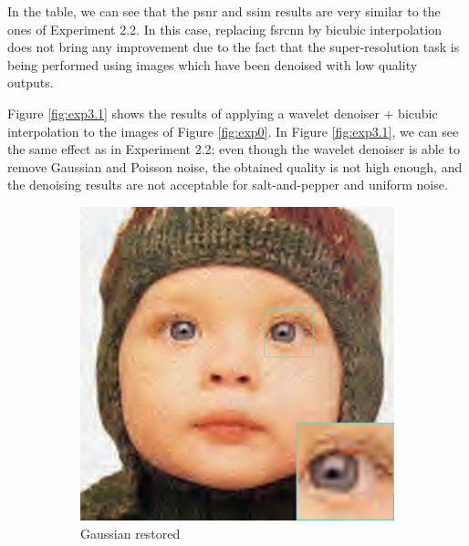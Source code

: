 In the table, we can see that the \gls{psnr} and \gls{ssim} results are very similar to the ones of Experiment 2.2. In this case, replacing \gls{fsrcnn} by bicubic interpolation does not bring any improvement due to the fact that the super-resolution task is being performed using images which have been denoised with low quality outputs.

Figure \ref{fig:exp3.1} shows the results of applying a wavelet denoiser $+$ bicubic interpolation to the images of Figure \ref{fig:exp0}. In Figure \ref{fig:exp3.1}, we can see the same effect as in Experiment 2.2: even though the wavelet denoiser is able to remove Gaussian and Poisson noise, the obtained quality is not high enough, and the denoising results are not acceptable for salt-and-pepper and uniform noise.

\begin{figure}
	\centering
	\begin{subfigure}{0.24\textwidth}
		\includegraphics[width=\textwidth]{images/exp3.1/gaussian.png}
		\caption{Gaussian restored}
	\end{subfigure}
	\begin{subfigure}{0.24\textwidth}

\end{subfigure}
\end{figure}
